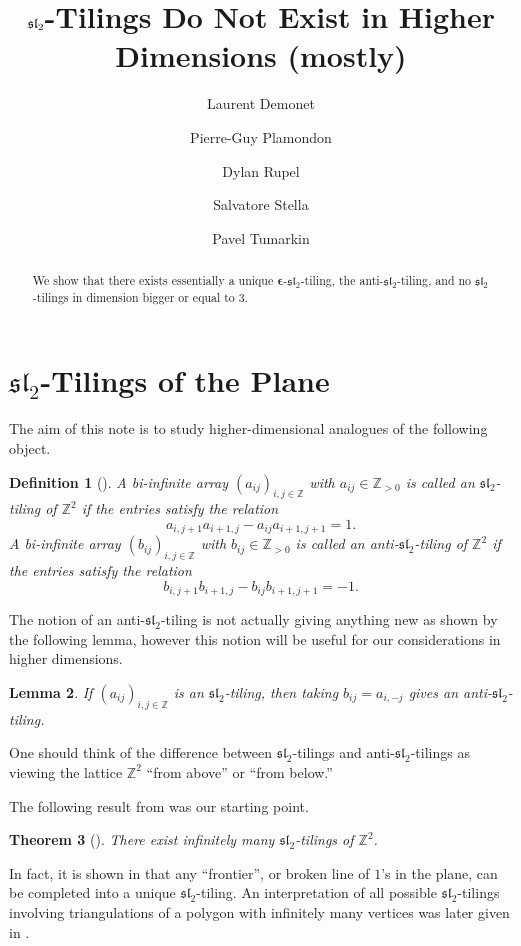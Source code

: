 \documentclass{amsart}
\author[Demonet]{Laurent Demonet}
\author[Plamondon]{Pierre-Guy Plamondon}
\author[Rupel]{Dylan Rupel}
\author[Stella]{Salvatore Stella}
\author[Tumarkin]{Pavel Tumarkin}
\title{$\fsl_2$-Tilings Do Not Exist in Higher Dimensions (mostly)}
\newtheorem{theorem}{Theorem}
\newtheorem{definition}[theorem]{Definition}
\newtheorem{lemma}[theorem]{Lemma}
\newcommand{\bepsilon}{\boldsymbol{\epsilon}}
\newcommand{\fsl}{\mathfrak{sl}}
\newcommand{\ZZ}{\mathbb{Z}}
\begin{document}
\begin{abstract}
  We show that there exists essentially a unique $\bepsilon$-$\fsl_2$-tiling, the anti-$\fsl_2$-tiling, and no $\fsl_2$-tilings in dimension bigger or equal to 3.
\end{abstract}
\maketitle

\section{$\fsl_2$-Tilings of the Plane}
  The aim of this note is to study higher-dimensional analogues of the following object.
  \begin{definition}[\cite{AssemReutenauerSmith}]
    A bi-infinite array $(a_{ij})_{i,j\in\ZZ}$ with $a_{ij}\in\ZZ_{>0}$ is called an \emph{$\fsl_2$-tiling of $\ZZ^2$} if the entries satisfy the relation
    \begin{equation}\label{eq:sl2 recursion}
      a_{i,j+1}a_{i+1,j}-a_{ij}a_{i+1,j+1}=1.
    \end{equation}
    A bi-infinite array $(b_{ij})_{i,j\in\ZZ}$ with $b_{ij}\in\ZZ_{>0}$  is called an \emph{anti-$\fsl_2$-tiling of $\ZZ^2$} if the entries satisfy the relation
    \begin{equation}\label{eq:anti-sl2 recursion}
      b_{i,j+1}b_{i+1,j}-b_{ij}b_{i+1,j+1}=-1.
    \end{equation}
  \end{definition}
  The notion of an anti-$\fsl_2$-tiling is not actually giving anything new as shown by the following lemma, however this notion will be useful for our considerations in higher dimensions.
  \begin{lemma}
    If $(a_{ij})_{i,j\in\ZZ}$ is an $\fsl_2$-tiling, then taking $b_{ij}=a_{i,-j}$ gives an anti-$\fsl_2$-tiling.
  \end{lemma}
  One should think of the difference between $\fsl_2$-tilings and anti-$\fsl_2$-tilings as viewing the lattice $\ZZ^2$ ``from above'' or ``from below.''

  The following result from \cite{AssemReutenauerSmith} was our starting point.
  \begin{theorem}[\cite{AssemReutenauerSmith}]
    There exist infinitely many $\fsl_2$-tilings of $\ZZ^2$.
  \end{theorem}

  In fact, it is shown in \cite{AssemReutenauerSmith} that any ``frontier'', or broken line of $1$'s in the plane, can be completed into a unique $\fsl_2$-tiling.
  An interpretation of all possible $\fsl_2$-tilings involving triangulations of a polygon with infinitely many vertices was later given in \cite{HolmJorgensen}.
\end{document}
